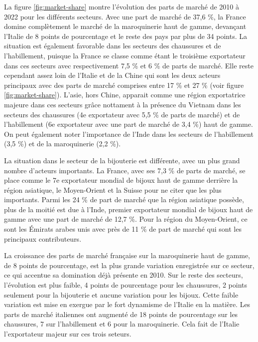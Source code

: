 \documentclass[french,10pt,a4paper]{article}
\begin{document}
La figure \ref{fig:market-share} montre l'évolution des parts de marché de 2010 à 2022 pour les différents secteurs. Avec une part de marché de 37,6 \%, la France domine complètement le marché de la maroquinerie haut de gamme, devançant l'Italie de 8 points de pourcentage et le reste des pays par plus de 34 points. La situation est également favorable dans les secteurs des chaussures et de l'habillement, puisque la France se classe comme étant le troisième exportateur dans ces secteurs avec respectivement 7,5 \% et 6 \% de parts de marché. Elle reste cependant assez loin de l'Italie et de la Chine qui sont les deux acteurs principaux avec des parts de marché comprises entre 17 \% et 27 \% (voir figure \ref{fig:market-share}). L'asie, hors Chine, apparait comme une région exportatrice majeure dans ces secteurs grâce nottament à la présence du Vietnam dans les secteurs des chaussures (4e exportateur avec 5,5 \% de parts de marché) et de l'habillement (6e exportateur avec une part de marché de 3,4 \%) haut de gamme. On peut également noter l'importance de l'Inde dans les secteurs de l'habillement (3,5 \%) et de la maroquinerie (2,2 \%).

La situation dans le secteur de la bijouterie est différente, avec un plus grand nombre d'acteurs importants. La France, avec ses 7,3 \% de parts de marché, se place comme le 7e exportateur mondial de bijoux haut de gamme derrière la région asiatique, le Moyen-Orient et la Suisse pour ne citer que les plus importants. Parmi les 24 \% de part de marché que la région asiatique possède, plus de la moitié est due à l'Inde, premier exportateur mondial de bijoux haut de gamme avec une part de marché de 12,7 \%. Pour la région du Moyen-Orient, ce sont les Émirats arabes unis avec près de 11 \% de part de marché qui sont les principaux contributeurs.

\bigskip

La croissance des parts de marché française sur la maroquinerie haut de gamme, de 8 points de pourcentage, est la plus grande variation enregistrée sur ce secteur, ce qui accentue sa domination déjà présente en 2010. Sur le reste des secteurs, l'évolution est plus faible, 4 points de pourcentage pour les chaussures, 2 points seulement pour la bijouterie et aucune variation pour les bijoux. Cette faible variation est mise en exergue par le fort dynamisme de l'Italie en la matière. Les parts de marché italiennes ont augmenté de 18 points de pourcentage sur les chaussures, 7 sur l'habillement et 6 pour la maroquinerie. Cela fait de l'Italie l'exportateur majeur sur ces trois seteurs. 
\end{document}
